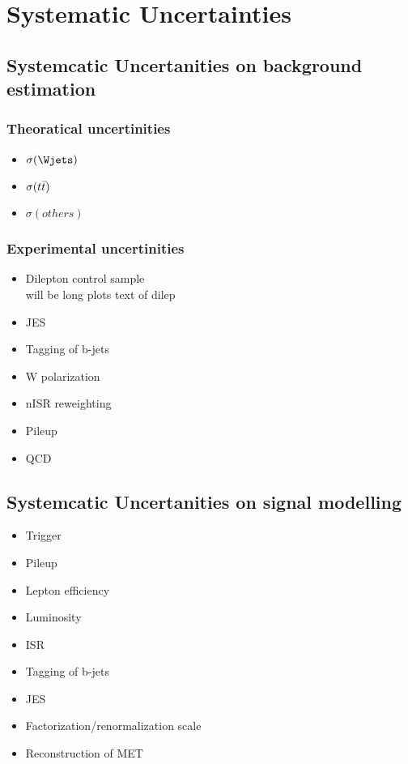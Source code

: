 \chapter{Systematic Uncertainties}
\section{Systemcatic Uncertanities on background estimation}
\subsection{Theoratical uncertinities}
\begin{itemize}
\item $\sigma(\Wjets)$ 
\item $\sigma(t\bar{t})$ 
\item $\sigma(others)$
\newpage
\end{itemize}
\subsection{Experimental uncertinities}
\begin{itemize}
\item Dilepton control sample \\ 
will be long
plots
\newpage
text of dilep
\newpage
\item JES
\item Tagging of b-jets
\item W polarization  
\newpage
\item nISR reweighting
\item Pileup 
\item QCD
\end{itemize}
\newpage

\section{Systemcatic Uncertanities on signal modelling}
\begin{itemize}
\item Trigger
\item Pileup
\item Lepton efficiency 
\newpage
\item Luminosity
\item ISR
\item Tagging of b-jets
\newpage
\item JES
\item Factorization/renormalization scale
\item Reconstruction of MET 
\end{itemize}
\newpage
